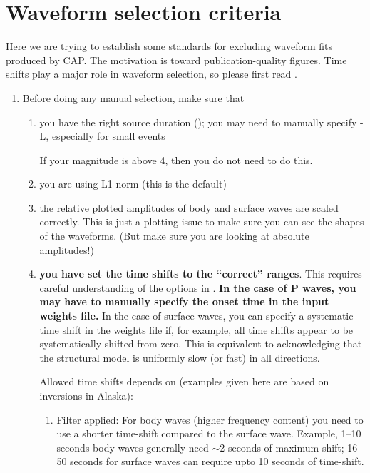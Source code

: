 \section{Waveform selection criteria}

Here we are trying to establish some standards for excluding waveform fits produced by CAP.
The motivation is toward publication-quality figures.
Time shifts play a major role in waveform selection, so please first read .

\begin{enumerate}

\item Before doing any manual selection, make sure that
\begin{enumerate}
\item you have the right source duration (); you may need to manually specify -L, especially for small events

If your magnitude is above 4, then you do not need to do this.

\item you are using L1 norm (this is the default)

\item the relative plotted amplitudes of body and surface waves are scaled correctly. This is just a plotting issue to make sure you can see the shapes of the waveforms. (But make sure you are looking at absolute amplitudes!)

\item {\bf you have set the time shifts to the ``correct'' ranges}. This requires careful understanding of the options in . {\bf In the case of P waves, you may have to manually specify the onset time in the input weights file.}
In the case of surface waves, you can specify a systematic time shift in the weights file if, for example, all time shifts appear to be systematically shifted from zero. This is equivalent to acknowledging that the structural model is uniformly slow (or fast) in all directions.

Allowed time shifts depends on (examples given here are based on inversions in Alaska):
%
\begin{enumerate}
\item Filter applied: For body waves (higher frequency content) you need to use a shorter time-shift compared to the surface wave. Example, 1--10 seconds body waves generally need $\sim$2 seconds of maximum shift; 16--50 seconds for surface waves can require upto 10 seconds of time-shift.


\end{enumerate}
\end{enumerate}
\end{enumerate}

